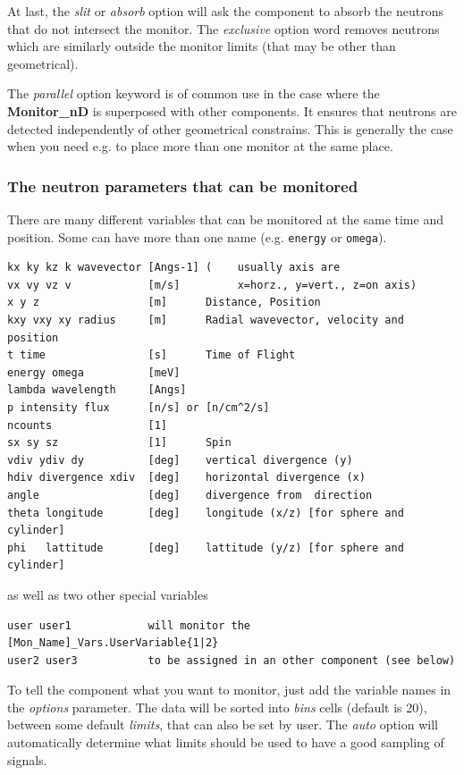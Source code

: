 At last, the \textit{slit} or \textit{absorb} option will ask the component to
absorb the neutrons that do not intersect the monitor. The \textit{exclusive} option word removes neutrons which are similarly outside the monitor limits (that may be other than geometrical).

The \textit{parallel} option keyword is of common use in the case where the \textbf{Monitor\_nD} is superposed with other components. It ensures that neutrons are detected independently of other geometrical constrains. This is generally the case when you need e.g. to place more than one monitor at the same place.

\subsubsection{The neutron parameters that can be monitored}

There are many different variables that can be monitored at the same time
and position. Some can have more than one name (e.g. \texttt{energy} or
\texttt{omega}).


\begin{lstlisting}
kx ky kz k wavevector [Angs-1] (    usually axis are
vx vy vz v            [m/s]         x=horz., y=vert., z=on axis)
x y z                 [m]      Distance, Position
kxy vxy xy radius     [m]      Radial wavevector, velocity and position
t time                [s]      Time of Flight
energy omega          [meV]
lambda wavelength     [Angs]
p intensity flux      [n/s] or [n/cm^2/s]
ncounts               [1]
sx sy sz              [1]      Spin
vdiv ydiv dy          [deg]    vertical divergence (y)
hdiv divergence xdiv  [deg]    horizontal divergence (x)
angle                 [deg]    divergence from  direction
theta longitude       [deg]    longitude (x/z) [for sphere and cylinder]
phi   lattitude       [deg]    lattitude (y/z) [for sphere and cylinder]
\end{lstlisting}
as well as two other special variables
\begin{lstlisting}
user user1            will monitor the [Mon_Name]_Vars.UserVariable{1|2}
user2 user3           to be assigned in an other component (see below)
\end{lstlisting}

To tell the component what you want to monitor, just add the variable
names in the \textit{options} parameter. The data will be sorted into \textit{
  bins} cells (default is 20), between some default \textit{limits}, that
can also be set by user. The \textit{auto} option will automatically
determine what limits should be used to have a good sampling of signals.

